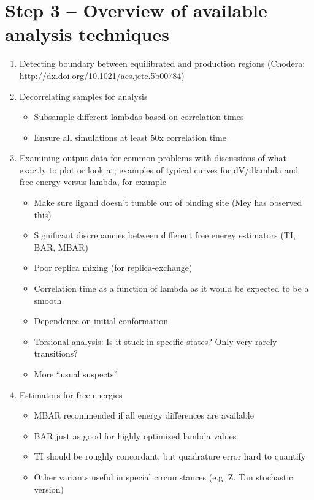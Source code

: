 \documentclass[9pt,bestpractices]{livecoms}
\begin{document}
\section{Step 3 -- Overview of available analysis techniques}
\label{sec:step3}
\begin{enumerate}
\item Detecting boundary between equilibrated and production regions (Chodera: \url{http://dx.doi.org/10.1021/acs.jctc.5b00784})
\item Decorrelating samples for analysis
\begin{itemize}
\item Subsample different lambdas based on correlation times
\item Ensure all simulations at least 50x correlation time
\end{itemize}
\item Examining output data for common problems with discussions of what exactly to plot or look at; examples of typical curves for dV/dlambda and free energy versus lambda, for example
\begin{itemize}
\item Make sure ligand doesn’t tumble out of binding site (Mey has observed this)
\item Significant discrepancies between different free energy estimators (TI, BAR, MBAR)
\item Poor replica mixing (for replica-exchange)
\item Correlation time as a function of lambda as it would be expected to be a smooth
\item Dependence on initial conformation
\item Torsional analysis: Is it stuck in specific states? Only very rarely transitions?
\item More “usual suspects”
\end{itemize}
\item Estimators for free energies
\begin{itemize}
\item MBAR recommended if all energy differences are available
\item BAR just as good for highly optimized lambda values
\item TI should be roughly concordant, but quadrature error hard to quantify
\item Other variants useful in special circumstances (e.g. Z. Tan stochastic version)
\end{itemize}

\end{enumerate}
\end{document}
